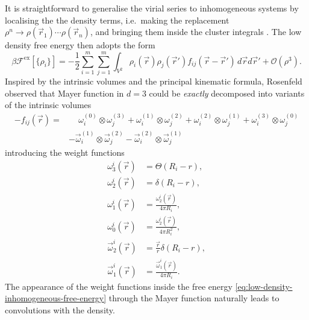 It is straightforward to generalise the virial series to inhomogeneous systems by localising the the density terms, i.e.\ making the replacement $\rho^n \to \rho(\vec{r}_1) \cdots \rho(\vec{r}_n)$, and bringing them inside the cluster integrals \cite{StillingerJCP1962,RowlinsonPRSA1985}.
The low density free energy then adopts the form
\begin{equation}\label{eq:low-density-inhomogeneous-free-energy}
  \beta \mathcal{F}^\mathrm{ex}[\{\rho_i\}]
  =
  - \frac{1}{2}
  \sum_{i = 1}^m \sum_{j = 1}^m \int_{V^2}
  \rho_i(\vec{r}) \rho_j(\vec{r}')
  f_{ij}(\vec{r} - \vec{r}')
  \, d\vec{r} d\vec{r}'
  + \mathcal{O}(\rho^3).
\end{equation}
Inspired by the intrinsic volumes and the principal kinematic formula, Rosenfeld observed that Mayer function in $d=3$ could be \emph{exactly} decomposed into variants of the intrinsic volumes%
\cite{RosenfeldPRL1989}
\begin{equation*}
  \begin{split}
    -f_{ij}(\vec{r})
    =& \quad\,
    \omega_i^{(0)} \otimes \omega_j^{(3)}
    + \omega_i^{(1)} \otimes \omega_j^{(2)}
    + \omega_i^{(2)} \otimes \omega_j^{(1)}
    + \omega_i^{(3)} \otimes \omega_j^{(0)}
    \\ &
    - \vec\omega_i^{(1)} \otimes \vec\omega_j^{(2)}
    - \vec\omega_i^{(2)} \otimes \vec\omega_j^{(1)}
  \end{split}
\end{equation*}
introducing the weight functions
\begin{subequations}
  \begin{align}
    \omega_3^i(\vec{r})
    &=
    \Theta(R_i - r),
    \\
    \omega_2^i(\vec{r})
    &=
    \delta(R_i - r),
    \\
    \omega_1^i(\vec{r})
    &=
    \frac{\omega_2^i(\vec{r})}{4\pi R_i},
    \\
    \omega_0^i(\vec{r})
    &=
    \frac{\omega_2^i(\vec{r})}{4\pi R_i^2},
    \\
    \vec{\omega}_2^i(\vec{r})
    &=
    \frac{\vec{r}}{r} \delta(R_i - r),
    \\
    \vec{\omega}_1^i(\vec{r})
    &=
    \frac{\vec{\omega}_1^i(\vec{r})}{4\pi R_i}.
  \end{align}
\end{subequations}
The appearance of the weight functions inside the free energy \eqref{eq:low-density-inhomogeneous-free-energy} through the Mayer function naturally leads to convolutions with the density.
